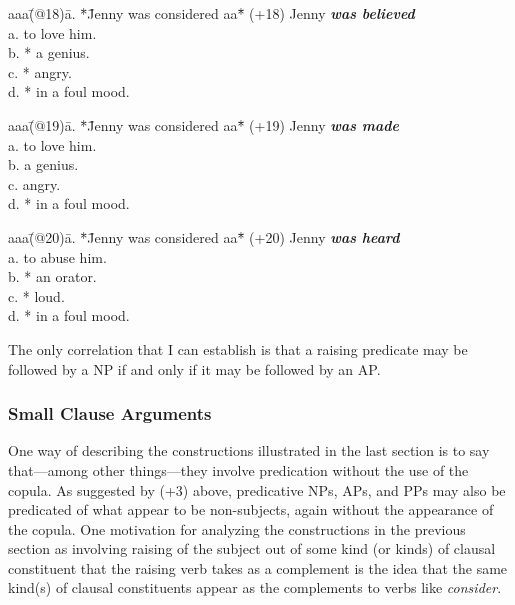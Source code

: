 \begin{tabbing}
aaa\=(@18)\= a. \= *\= Jenny was considered aa\= *\=        \kill
   \>(+18)\>    \>  \> Jenny {\em \bf was believed}                \\
   \>     \> a. \>  \>                  \>  \> to love him. \\
   \>     \> b. \>  \>                  \> *\> a genius.    \\    
   \>     \> c. \>  \>                  \> *\> angry.    \\    
   \>     \> d. \>  \>                  \> *\> in a foul mood.
\end{tabbing}
\begin{tabbing}
aaa\=(@19)\= a. \= *\= Jenny was considered aa\= *\=        \kill
   \>(+19)\>    \>  \> Jenny {\em \bf was made}                \\
   \>     \> a. \>  \>                  \>  \> to love him. \\
   \>     \> b. \>  \>                  \>  \> a genius.    \\    
   \>     \> c. \>  \>                  \>  \> angry.    \\    
   \>     \> d. \>  \>                  \> *\> in a foul mood.
\end{tabbing}
\begin{tabbing}
aaa\=(@20)\= a. \= *\= Jenny was considered aa\= *\=        \kill
   \>(+20)\>    \>  \> Jenny {\em \bf was heard}                \\
   \>     \> a. \>  \>                  \>  \> to abuse him. \\
   \>     \> b. \>  \>                  \> *\> an orator.    \\    
   \>     \> c. \>  \>                  \> *\> loud.    \\    
   \>     \> d. \>  \>                  \> *\> in a foul mood.
\end{tabbing}

The only correlation that I can establish is that a raising predicate
may be followed by a NP if and only if it may be followed by an AP.


\subsubsection{Small Clause Arguments}

\label{sc}
One way of describing the constructions illustrated in the last section
is to say that---among other things---they involve predication without
the use of the copula. As suggested by (+3) above, predicative NPs, APs,
and PPs may also be predicated of what appear to be non-subjects, again
without the appearance of the copula.  One
motivation for analyzing the constructions in the previous section as
involving raising of the subject out of some kind (or kinds) of
clausal constituent that the raising verb takes as a complement is the
idea that the same kind(s) of clausal constituents appear as the
complements to verbs like {\em consider\/}. 


